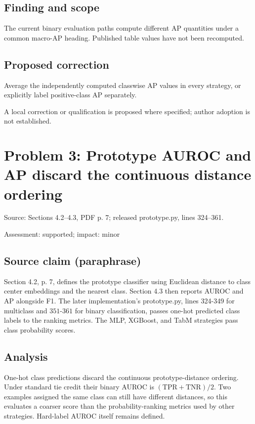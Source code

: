 \documentclass[11pt]{article}
\begin{document}
\subsection*{Finding and scope}

The current binary evaluation paths compute different AP quantities under a common macro-AP heading. Published table values have not been recomputed.

\subsection*{Proposed correction}

Average the independently computed classwise AP values in every strategy, or explicitly label positive-class AP separately.

A local correction or qualification is proposed where specified; author adoption is not established.

\section*{Problem 3: Prototype AUROC and AP discard the continuous distance ordering}

Source: Sections 4.2–4.3, PDF p. 7; released prototype.py, lines 324–361.

Assessment: supported; impact: minor

\subsection*{Source claim (paraphrase)}

Section 4.2, p. 7, defines the prototype classifier using Euclidean distance to class center embeddings and the nearest class. Section 4.3 then reports AUROC and AP alongside F1. The later implementation’s prototype.py, lines 324-349 for multiclass and \(351\)-\(361\) for binary classification, passes one-hot predicted class labels to the ranking metrics. The MLP, XGBoost, and TabM strategies pass class probability scores.

\subsection*{Analysis}

One-hot class predictions discard the continuous prototype-distance ordering. Under standard tie credit their binary AUROC is \((\mathrm{TPR}+\mathrm{TNR})/2\). Two examples assigned the same class can still have different distances, so this evaluates a coarser score than the probability-ranking metrics used by other strategies. Hard-label AUROC itself remains defined.
\end{document}
